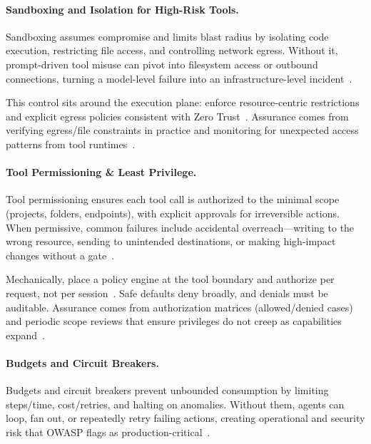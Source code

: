 \begin{TNtwocol}
  \paragraph{Sandboxing and Isolation for High-Risk Tools.}
  Sandboxing assumes compromise and limits blast radius by isolating code execution, restricting file access, and controlling network egress. Without it, prompt-driven tool misuse can pivot into filesystem access or outbound connections, turning a model-level failure into an infrastructure-level incident~\cite{nist-sp800-207,cisa-ztmm-v2}.

  This control sits around the execution plane: enforce resource-centric restrictions and explicit egress policies consistent with Zero Trust~\cite{nist-sp800-207,cisa-ztmm-v2}. Assurance comes from verifying egress/file constraints in practice and monitoring for unexpected access patterns from tool runtimes~\cite{nist-sp800-207,cisa-ztmm-v2}.

  \paragraph{Tool Permissioning \& Least Privilege.}
  Tool permissioning ensures each tool call is authorized to the minimal scope (projects, folders, endpoints), with explicit approvals for irreversible actions. When permissive, common failures include accidental overreach—writing to the wrong resource, sending to unintended destinations, or making high-impact changes without a gate~\cite{nist-sp800-207,cisa-ztmm-v2}.

  Mechanically, place a policy engine at the tool boundary and authorize per request, not per session~\cite{nist-sp800-207,cisa-ztmm-v2}. Safe defaults deny broadly, and denials must be auditable. Assurance comes from authorization matrices (allowed/denied cases) and periodic scope reviews that ensure privileges do not creep as capabilities expand~\cite{nist-sp800-207,cisa-ztmm-v2}.

  \paragraph{Budgets and Circuit Breakers.}
  Budgets and circuit breakers prevent unbounded consumption by limiting steps/time, cost/retries, and halting on anomalies. Without them, agents can loop, fan out, or repeatedly retry failing actions, creating operational and security risk that OWASP flags as production-critical~\cite{owasp-top10-llm-2025,cisa-ztmm-v2}.


\end{TNtwocol}
